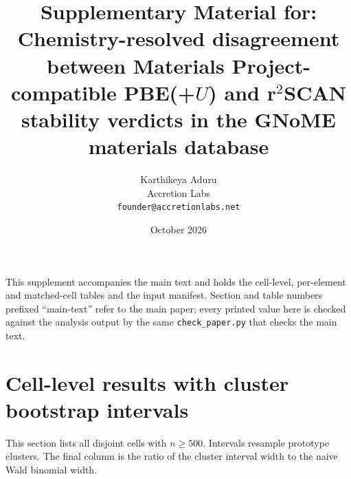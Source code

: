 \documentclass[11pt]{article}
\title{\textbf{Supplementary Material for:\\ Chemistry-resolved disagreement between Materials Project-compatible
PBE(+$U$) and r$^2$SCAN stability verdicts in the GNoME materials database}}
\author{Karthikeya Aduru \\ \small Accretion Labs \\ \small \texttt{founder@accretionlabs.net}}
\date{October 2026}
\begin{document}
\maketitle
\noindent This supplement accompanies the main text and holds the cell-level, per-element
and matched-cell tables and the input manifest. Section and table numbers prefixed
``main-text'' refer to the main paper; every printed value here is checked against the
analysis output by the same \texttt{check\_paper.py} that checks the main text.
\sloppy

\section{Cell-level results with cluster bootstrap intervals}\label{app:cells}

This section lists all disjoint cells with $n \ge 500$. Intervals resample prototype
clusters. The final column is the ratio of the cluster interval width to the naive Wald binomial width.
\end{document}
